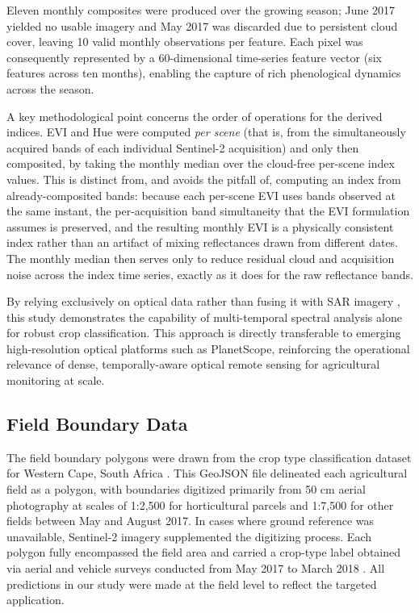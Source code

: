 \documentclass[pdflatex,sn-mathphys]{sn-jnl} %
\begin{document}
Eleven monthly composites were produced over the growing season; June 2017 yielded no usable imagery and May 2017 was discarded due to persistent cloud cover, leaving 10 valid monthly observations per feature. Each pixel was consequently represented by a 60-dimensional time-series feature vector (six features across ten months), enabling the capture of rich phenological dynamics across the season.

A key methodological point concerns the order of operations for the derived indices. EVI and Hue were computed \emph{per scene} (that is, from the simultaneously acquired bands of each individual Sentinel-2 acquisition) and only then composited, by taking the monthly median over the cloud-free per-scene index values. This is distinct from, and avoids the pitfall of, computing an index from already-composited bands: because each per-scene EVI uses bands observed at the same instant, the per-acquisition band simultaneity that the EVI formulation assumes is preserved, and the resulting monthly EVI is a physically consistent index rather than an artifact of mixing reflectances drawn from different dates. The monthly median then serves only to reduce residual cloud and acquisition noise across the index time series, exactly as it does for the raw reflectance bands.

By relying exclusively on optical data rather than fusing it with SAR imagery \cite{sar2022,liu2024}, this study demonstrates the capability of multi-temporal spectral analysis alone for robust crop classification. This approach is directly transferable to emerging high-resolution optical platforms such as PlanetScope, reinforcing the operational relevance of dense, temporally-aware optical remote sensing for agricultural monitoring at scale.

\subsection{Field Boundary Data}

The field boundary polygons were drawn from the crop type classification dataset for Western Cape, South Africa \cite{mlhub}. This GeoJSON file delineated each agricultural field as a polygon, with boundaries digitized primarily from 50 cm aerial photography at scales of 1:2,500 for horticultural parcels and 1:7,500 for other fields between May and August 2017. In cases where ground reference was unavailable, Sentinel-2 imagery supplemented the digitizing process. Each polygon fully encompassed the field area and carried a crop-type label obtained via aerial and vehicle surveys conducted from May 2017 to March 2018 \cite{mlhub}. All predictions in our study were made at the field level to reflect the targeted application.
\end{document}
